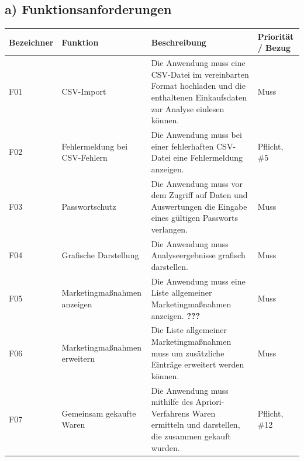 \documentclass[a4paper,10pt]{article}
\begin{document}
        \subsection*{a) Funktionsanforderungen}
        \begin{longtable}{>{\raggedright\arraybackslash}p{}>{\raggedright\arraybackslash}p{}>{\raggedright\arraybackslash}p{}>{\raggedright\arraybackslash}p{}}
            \toprule
            \textbf{Bezeichner} & \textbf{Funktion}                              & \textbf{Beschreibung}                                                                                                             & \textbf{Priorität / Bezug} \\
            \midrule\endhead
            \bottomrule\endfoot
            F01                 & CSV-Import                                     & Die Anwendung muss eine CSV-Datei im vereinbarten Format hochladen und die enthaltenen Einkaufsdaten zur Analyse einlesen können. & Muss \\
            \midrule
            F02                 & Fehlermeldung bei CSV-Fehlern                  & Die Anwendung muss bei einer fehlerhaften CSV-Datei eine Fehlermeldung anzeigen. & Pflicht, \#5 \\
            \midrule
            F03                 & Passwortschutz                                 & Die Anwendung muss vor dem Zugriff auf Daten und Auswertungen die Eingabe eines gültigen Passworts verlangen. & Muss \\
            \midrule
            F04                 & Grafische Darstellung                          & Die Anwendung muss Analyseergebnisse grafisch darstellen. & Muss \\
            \midrule
            F05                 & Marketingma\ss{}nahmen anzeigen                & Die Anwendung muss eine Liste allgemeiner Marketingma\ss{}nahmen anzeigen. \textbf{???} & Muss \\
            \midrule
            F06                 & Marketingma\ss{}nahmen erweitern               & Die Liste allgemeiner Marketingma\ss{}nahmen muss um zusätzliche Einträge erweitert werden können. & Muss \\
            \midrule
            F07                 & Gemeinsam gekaufte Waren                       & Die Anwendung muss mithilfe des Apriori-Verfahrens Waren ermitteln und darstellen, die zusammen gekauft wurden. & Pflicht, \#12 \\

\end{longtable}
\end{document}
